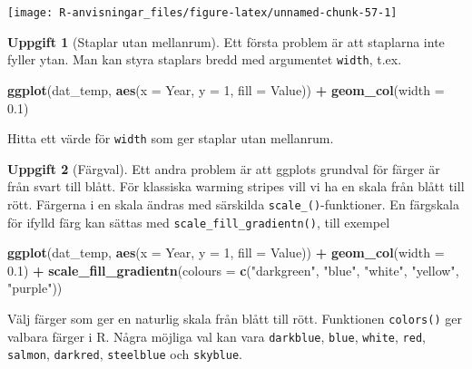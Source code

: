 \documentclass[
]{book}
\newenvironment{Shaded}{\begin{snugshade}}{\end{snugshade}}
\newcommand{\AttributeTok}[1]{\textcolor[rgb]{0.13,0.29,0.53}{#1}}
\newcommand{\DecValTok}[1]{\textcolor[rgb]{0.00,0.00,0.81}{#1}}
\newcommand{\FloatTok}[1]{\textcolor[rgb]{0.00,0.00,0.81}{#1}}
\newcommand{\FunctionTok}[1]{\textcolor[rgb]{0.13,0.29,0.53}{\textbf{#1}}}
\newcommand{\NormalTok}[1]{#1}
\newcommand{\SpecialCharTok}[1]{\textcolor[rgb]{0.81,0.36,0.00}{\textbf{#1}}}
\newcommand{\StringTok}[1]{\textcolor[rgb]{0.31,0.60,0.02}{#1}}
\theoremstyle{definition}
\theoremstyle{definition}
\theoremstyle{definition}
\newtheorem{exercise}{Uppgift}[chapter]
\theoremstyle{definition}
\theoremstyle{remark}
\begin{document}
\begin{center}\texttt{[image: R-anvisningar\_files/figure-latex/unnamed-chunk-57-1]} \end{center}

\begin{exercise}[Staplar utan mellanrum]
Ett första problem är att staplarna inte fyller ytan. Man kan styra staplars bredd med argumentet \texttt{width}, t.ex.

\begin{Shaded}
\begin{Highlighting}[]
\FunctionTok{ggplot}\NormalTok{(dat\_temp, }\FunctionTok{aes}\NormalTok{(}\AttributeTok{x =}\NormalTok{ Year, }\AttributeTok{y =} \DecValTok{1}\NormalTok{, }\AttributeTok{fill =}\NormalTok{ Value)) }\SpecialCharTok{+}
  \FunctionTok{geom\_col}\NormalTok{(}\AttributeTok{width =} \FloatTok{0.1}\NormalTok{)}
\end{Highlighting}
\end{Shaded}

Hitta ett värde för \texttt{width} som ger staplar utan mellanrum.
\end{exercise}

\begin{exercise}[Färgval]
Ett andra problem är att ggplots grundval för färger är från svart till blått. För klassiska warming stripes vill vi ha en skala från blått till rött. Färgerna i en skala ändras med särskilda \texttt{scale\_()}-funktioner. En färgskala för ifylld färg kan sättas med \texttt{scale\_fill\_gradientn()}, till exempel

\begin{Shaded}
\begin{Highlighting}[]
\FunctionTok{ggplot}\NormalTok{(dat\_temp, }\FunctionTok{aes}\NormalTok{(}\AttributeTok{x =}\NormalTok{ Year, }\AttributeTok{y =} \DecValTok{1}\NormalTok{, }\AttributeTok{fill =}\NormalTok{ Value)) }\SpecialCharTok{+}
  \FunctionTok{geom\_col}\NormalTok{(}\AttributeTok{width =} \FloatTok{0.1}\NormalTok{) }\SpecialCharTok{+}
  \FunctionTok{scale\_fill\_gradientn}\NormalTok{(}\AttributeTok{colours =} \FunctionTok{c}\NormalTok{(}\StringTok{"darkgreen"}\NormalTok{, }\StringTok{"blue"}\NormalTok{, }\StringTok{"white"}\NormalTok{, }\StringTok{"yellow"}\NormalTok{, }\StringTok{"purple"}\NormalTok{))}
\end{Highlighting}
\end{Shaded}

Välj färger som ger en naturlig skala från blått till rött. Funktionen \texttt{colors()} ger valbara färger i R. Några möjliga val kan vara \texttt{darkblue}, \texttt{blue}, \texttt{white}, \texttt{red}, \texttt{salmon}, \texttt{darkred}, \texttt{steelblue} och \texttt{skyblue}.
\end{exercise}
\end{document}
